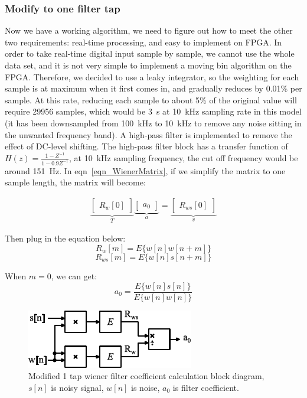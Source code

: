 \subsubsection{Modify to one filter tap}

Now we have a working algorithm, we need to figure out how to meet the other two requirements: real-time processing, and easy to implement on FPGA.  In order to take real-time digital input sample by sample, we cannot use the whole data set, and it is not very simple to implement a moving bin algorithm on the FPGA.  Therefore, we decided to use a leaky integrator, so the weighting for each sample is at maximum when it first comes in, and gradually reduces by 0.01\% per sample.  At this rate, reducing each sample to about 5\% of the original value will require 29956 samples, which would be \qty{3}{s} at \qty{10}{kHz} sampling rate in this model (it has been downsampled from \qty{100}{kHz} to \qty{10}{kHz} to remove any noise sitting in the unwanted frequency band).  A high-pass filter is implemented to remove the effect of DC-level shifting.  The high-pass filter block has a transfer function of $H(z)=\frac{1-Z^{-1}}{1-0.9Z^{-1}}$, at \qty{10}{kHz} sampling frequency, the cut off frequency would be around \qty{151}{Hz}.  In eqn~\ref{eqn_WienerMatrix}, if we simplify the matrix to one sample length, the matrix will become:

\begin{gather}
\underbrace{
    \begin{bmatrix}
    R_w[0]
    \end{bmatrix}
}_{T}
\underbrace{
    \begin{bmatrix}
    a_0
    \end{bmatrix}
}_{a}
=
\underbrace{
    \begin{bmatrix}
    R_{ws}[0]
    \end{bmatrix}
}_{v}
\end{gather}

Then plug in the equation below:
$$R_w[m]=E\{w[n]w[n+m]\}$$
$$R_{ws}[m]=E\{w[n]s[n+m]\}$$

When $m=0$, we can get:
\begin{equation}
\label{eqn_Wienera0}
a_0 = \frac{E\{w[n]s[n]\}}{E\{w[n]w[n]\}}
\end{equation}

\begin{figure}[H]
\centerline{\includegraphics[width=0.5\linewidth]{4-ANC_Sys/ModifiedWiener.pdf}}
\caption{Modified 1 tap wiener filter coefficient calculation block diagram, $s[n]$ is noisy signal, $w[n]$ is noise, $a_0$ is filter coefficient.}
\label{fig_ModifiedWiener}
\end{figure}


